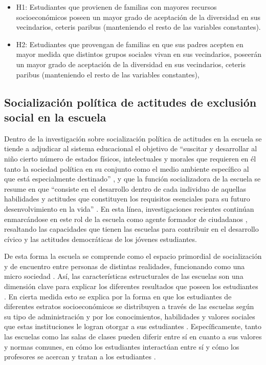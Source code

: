 \documentclass[12pt,twoside]{templates/facsothesis}
\begin{document}
\begin{itemize}
\item
  H1: Estudiantes que provienen de familias con mayores recursos socioeconómicos poseen un mayor grado de aceptación de la diversidad en sus vecindarios, ceteris paribus (manteniendo el resto de las variables constantes).
\item
  H2: Estudiantes que provengan de familias en que sus padres acepten en mayor medida que distintos grupos sociales vivan en sus vecindarios, poseerán un mayor grado de aceptación de la diversidad en sus vecindarios, ceteris paribus (manteniendo el resto de las variables constantes),
\end{itemize}

\hypertarget{socializaciuxf3n-poluxedtica-de-actitudes-de-exclusiuxf3n-social-en-la-escuela}{%
\subsection{Socialización política de actitudes de exclusión social en la escuela}\label{socializaciuxf3n-poluxedtica-de-actitudes-de-exclusiuxf3n-social-en-la-escuela}}

Dentro de la investigación sobre socialización política de actitudes en la escuela se tiende a adjudicar al sistema educacional el objetivo de ``suscitar y desarrollar al niño cierto número de estados físicos, intelectuales y morales que requieren en él tanto la sociedad política en su conjunto como el medio ambiente específico al que está especialmente destinado'' \citep[p.~60]{durkheim_educacion_1999}, y que la función socializadora de la escuela se resume en que ``consiste en el desarrollo dentro de cada individuo de aquellas habilidades y actitudes que constituyen los requisitos esenciales para su futuro desenvolvimiento en la vida'' \citep[p.~65]{parsons_clase_1976}. En esta línea, investigaciones recientes continúan enmarcándose en este rol de la escuela como agente formador de ciudadanos \citep{cox_Aprendizaje_2015, groof_Influence_2008, trevino_Influence_2017}, resaltando las capacidades que tienen las escuelas para contribuir en el desarrollo cívico y las actitudes democráticas de los jóvenes estudiantes.

De esta forma la escuela se comprende como el espacio primordial de socialización y de encuentro entre personas de distintas realidades, funcionando como una micro sociedad \citep{groof_Influence_2008}. Así, las características estructurales de las escuelas son una dimensión clave para explicar los diferentes resultados que poseen los estudiantes \citep{trevino_Influence_2018}. En cierta medida esto se explica por la forma en que los estudiantes de diferentes estratos socioeconómicos se distribuyen a través de las escuelas según su tipo de administración \citep{belleic_estudio_2013} y por los conocimientos, habilidades y valores sociales que estas instituciones le logran otorgar a sus estudiantes \citep{groof_Influence_2008}. Específicamente, tanto las escuelas como las salas de clases pueden diferir entre sí en cuanto a sus valores y normas comunes, en cómo los estudiantes interactúan entre sí y cómo los profesores se acercan y tratan a los estudiantes \citep{bayramozdemir_How_2020}.
\end{document}
